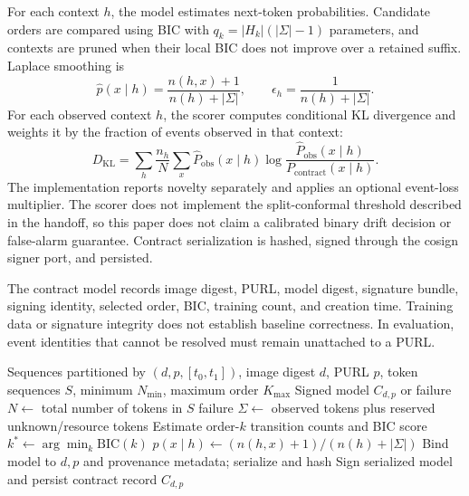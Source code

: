 \documentclass[conference]{IEEEtran}
\begin{document}
For each context $h$, the model estimates next-token probabilities. Candidate orders are compared using BIC with $q_k=|H_k|(|\Sigma|-1)$ parameters, and contexts are pruned when their local BIC does not improve over a retained suffix. Laplace smoothing is
\begin{equation}
\hat p(x\mid h)=\frac{n(h,x)+1}{n(h)+|\Sigma|},\qquad \epsilon_h=\frac{1}{n(h)+|\Sigma|}.
\label{eq:laplace}
\end{equation}
For each observed context $h$, the scorer computes conditional KL divergence and weights it by the fraction of events observed in that context:
\begin{equation}
D_{\mathrm{KL}}=\sum_h\frac{n_h}{N}\sum_x \widehat P_{\mathrm{obs}}(x\mid h)\log\frac{\widehat P_{\mathrm{obs}}(x\mid h)}{P_{\mathrm{contract}}(x\mid h)}.
\label{eq:kl}
\end{equation}
The implementation reports novelty separately and applies an optional event-loss multiplier. The scorer does not implement the split-conformal threshold described in the handoff, so this paper does not claim a calibrated binary drift decision or false-alarm guarantee. Contract serialization is hashed, signed through the cosign signer port, and persisted.

The contract model records image digest, PURL, model digest, signature bundle, signing identity, selected order, BIC, training count, and creation time. Training data or signature integrity does not establish baseline correctness. In evaluation, event identities that cannot be resolved must remain unattached to a PURL.

\begin{algorithm}[t]\caption{Behavioral contract construction}\label{alg:contract}\begin{algorithmic}[1]
\Require Sequences partitioned by $(d,p,[t_0,t_1])$, image digest $d$, PURL $p$, token sequences $S$, minimum $N_{\min}$, maximum order $K_{\max}$
\Ensure Signed model $C_{d,p}$ or failure
\State $N \gets$ total number of tokens in $S$
\State \Return failure\EndIf
\State $\Sigma \gets$ observed tokens plus reserved unknown/resource tokens
\State Estimate order-$k$ transition counts and BIC score\EndFor
\State $k^* \gets \arg\min_k \mathrm{BIC}(k)$
\State $\hat p(x\mid h) \gets (n(h,x)+1)/(n(h)+|\Sigma|)$\EndFor
\State Bind model to $d,p$ and provenance metadata; serialize and hash
\State Sign serialized model and persist contract record
\State \Return $C_{d,p}$
\end{algorithmic}\end{algorithm}
\end{document}
